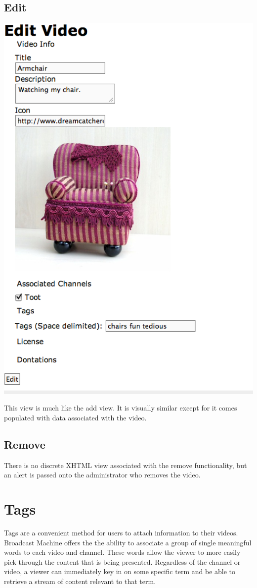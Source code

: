 \documentclass[a4paper,12pt]{report}
\begin{document}
\subsection{Edit}
\includegraphics[width=150mm]{images/videoedit.png}

This view is much like the add view. It is visually similar except for it comes populated with data associated with the video.

\subsection{Remove}
There is no discrete XHTML view associated with the remove functionality, but an alert is passed onto the administrator who removes the video.

\section{Tags}
Tags are a convenient method for users to attach information to their videos.
Broadcast Machine offers the the ability to associate a group of single meaningful words to each video and channel.
These words allow the viewer to more easily pick through the content that is being presented.
Regardless of the channel or video, a viewer can immediately key in on some specific term and be able to retrieve a stream of content relevant to that term.
\end{document}
